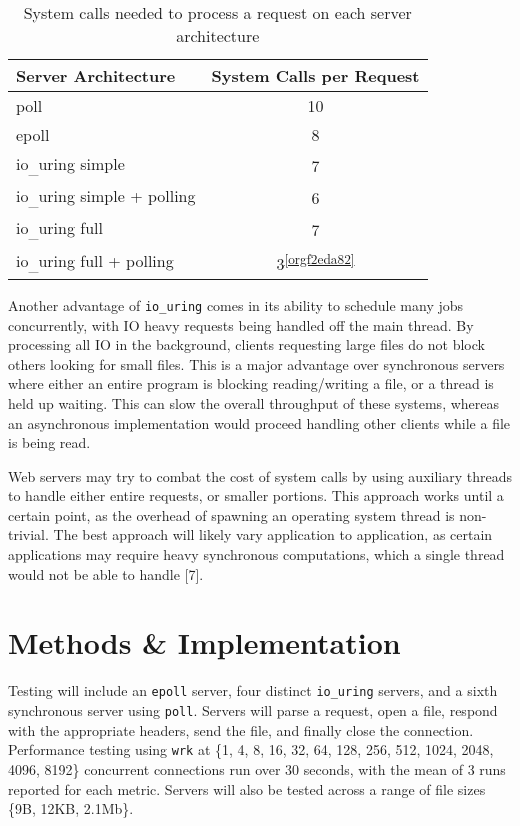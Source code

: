 \documentclass[conference]{IEEEtran}{}
\makeatletter
\newcommand{\cslcitation}[2]
 {\protect\hyper@linkstart{cite}{citeproc_bib_item_#1}#2\hyper@linkend}
\makeatother
\begin{document}
\begin{table}[htbp]
\caption{System calls needed to process a request on each server architecture}
\centering
\begin{tabular}{|l|c|}
Server Architecture & System Calls per Request\\
\hline
poll & 10\\
epoll & 8\\
io\textsubscript{\_}uring simple & 7\\
io\textsubscript{\_}uring simple + polling & 6\\
io\textsubscript{\_}uring full & 7\\
io\textsubscript{\_}uring full + polling & 3\textsuperscript{\ref{orgf2eda82}}\\
\end{tabular}
\end{table}

Another advantage of \texttt{io\_uring} comes in its ability to schedule many jobs concurrently, with IO heavy requests being handled off the main thread. By processing all IO in the background, clients requesting large files do not block others looking for small files. This is a major advantage over synchronous servers where either an entire program is blocking reading/writing a file, or a thread is held up waiting. This can slow the overall throughput of these systems, whereas an asynchronous implementation would proceed handling other clients while a file is being read.

Web servers may try to combat the cost of system calls by using auxiliary threads to handle either entire requests, or smaller portions. This approach works until a certain point, as the overhead of spawning an operating system thread is non-trivial. The best approach will likely vary application to application, as certain applications may require heavy synchronous computations, which a single thread would not be able to handle \cslcitation{7}{[7]}.
\section{Methods \& Implementation}
\label{sec:org8131cc8}
Testing will include an \texttt{epoll} server, four distinct \texttt{io\_uring} servers, and a sixth synchronous server using \texttt{poll}. Servers will parse a request, open a file, respond with the appropriate headers, send the file, and finally close the connection. Performance testing using \texttt{wrk} at \{1, 4, 8, 16, 32, 64, 128, 256, 512, 1024, 2048, 4096, 8192\} concurrent connections run over 30 seconds, with the mean of 3 runs reported for each metric. Servers will also be tested across a range of file sizes \{9B, 12KB, 2.1Mb\}.
\end{document}

